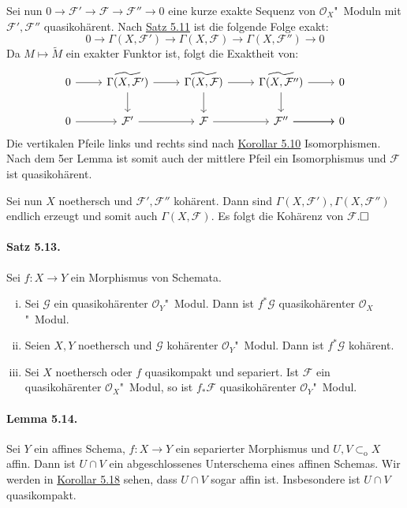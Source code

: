 \documentclass[11pt,b5paper,openany]{memoir}
\def \qed {$\hfill\square$}
\begin{document}
Sei nun $0\to\mathcal{F}'\to\mathcal{F}\to\mathcal{F}''\to 0$ eine kurze exakte Sequenz von $\mathcal{O}_X$"~Moduln mit $\mathcal{F}',\mathcal{F}''$ quasikohärent. Nach \hyperref[5.11]{Satz 5.11} ist die folgende Folge exakt:
\[0\to\Gamma(X,\mathcal{F}')\to\Gamma(X,\mathcal{F})\to\Gamma(X,\mathcal{F}'')\to 0 \]
Da $M\mapsto\widetilde{M}$ ein exakter Funktor ist, folgt die Exaktheit von:
\[\begin{tikzcd}
0  \ar[r]& \widetilde{\Gamma(X,\mathcal{F}')} \ar[d] \ar[r]& \widetilde{\Gamma(X,\mathcal{F})} \ar[d] \ar[r]& \widetilde{\Gamma(X,\mathcal{F}'')} \ar[d] \ar[r]& 0\\
0 \ar[r] & \mathcal{F}'  \ar[r]& \mathcal{F}  \ar[r]&  \ar[r]\mathcal{F}''  \ar[r]& 0
\end{tikzcd} \]
Die vertikalen Pfeile links und rechts sind nach \hyperref[5.10]{Korollar 5.10} Isomorphismen. Nach dem 5er Lemma ist somit auch der mittlere Pfeil ein Isomorphismus und $\mathcal{F}$ ist quasikohärent.

Sei nun $X$ noethersch und $\mathcal{F}',\mathcal{F}''$ kohärent. Dann sind $\Gamma(X,\mathcal{F}'),\Gamma(X,\mathcal{F}'')$ endlich erzeugt und somit auch $\Gamma(X,\mathcal{F})$. Es folgt die Kohärenz von $\mathcal{F}$.\qed

\paragraph{Satz 5.13.}\label{5.13} Sei $f:X\to Y$ ein Morphismus von Schemata.
\begin{enumerate}[(i)]
\item Sei $\mathcal{G}$ ein quasikohärenter $\mathcal{O}_Y$"~Modul. Dann ist $f^\ast\mathcal{G}$ quasikohärenter $\mathcal{O}_X$"~Modul.
\item Seien $X,Y$ noethersch und $\mathcal{G}$ kohärenter $\mathcal{O}_Y$"~Modul. Dann ist $f^\ast\mathcal{G}$ kohärent.
\item Sei $X$ noethersch oder $f$ quasikompakt und separiert. Ist $\mathcal{F}$ ein quasikohärenter $\mathcal{O}_X$"~Modul, so ist $f_\ast\mathcal{F}$ quasikohärenter $\mathcal{O}_Y$"~Modul.
\end{enumerate}

\paragraph{Lemma 5.14.}\label{5.14} Sei $Y$ ein affines Schema, $f:X\to Y$ ein separierter Morphismus und $U,V\subset_\text{o}X$ affin. Dann ist $U\cap V$ ein abgeschlossenes Unterschema eines affinen Schemas. Wir werden in \hyperref[5.18]{Korollar 5.18} sehen, dass $U\cap V$ sogar affin ist. Insbesondere ist $U\cap V$ quasikompakt.
\end{document}
